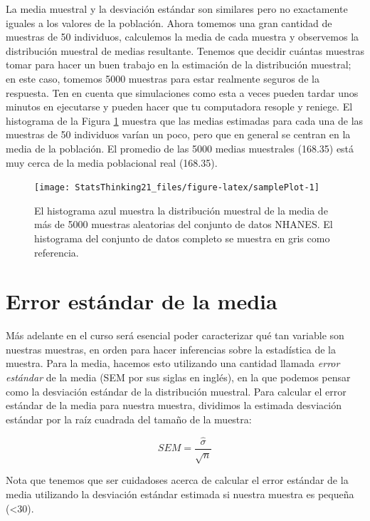 \documentclass[
  12pt,
]{book}
\begin{document}
La media muestral y la desviación estándar son similares pero no exactamente iguales a los valores de la población. Ahora tomemos una gran cantidad de muestras de 50 individuos, calculemos la media de cada muestra y observemos la distribución muestral de medias resultante. Tenemos que decidir cuántas muestras tomar para hacer un buen trabajo en la estimación de la distribución muestral; en este caso, tomemos 5000 muestras para estar realmente seguros de la respuesta. Ten en cuenta que simulaciones como esta a veces pueden tardar unos minutos en ejecutarse y pueden hacer que tu computadora resople y reniege. El histograma de la Figura \ref{fig:samplePlot} muestra que las medias estimadas para cada una de las muestras de 50 individuos varían un poco, pero que en general se centran en la media de la población. El promedio de las 5000 medias muestrales (168.35) está muy cerca de la media poblacional real (168.35).

\begin{figure}
\texttt{[image: StatsThinking21\_files/figure-latex/samplePlot-1]} \caption{El histograma azul muestra la distribución muestral de la media de más de 5000 muestras aleatorias del conjunto de datos NHANES. El histograma del conjunto de datos completo se muestra en gris como referencia.}\label{fig:samplePlot}
\end{figure}

\hypertarget{standard-error-of-the-mean}{%
\section{Error estándar de la media}\label{standard-error-of-the-mean}}

Más adelante en el curso será esencial poder caracterizar qué tan variable son nuestras muestras, en orden para hacer inferencias sobre la estadística de la muestra. Para la media, hacemos esto utilizando una cantidad llamada \emph{error estándar} de la media (SEM por sus siglas en inglés), en la que podemos pensar como la desviación estándar de la distribución muestral. Para calcular el error estándar de la media para nuestra muestra, dividimos la estimada desviación estándar por la raíz cuadrada del tamaño de la muestra:

\[
SEM = \frac{\hat{\sigma}}{\sqrt{n}}
\]

Nota que tenemos que ser cuidadoses acerca de calcular el error estándar de la media utilizando la desviación estándar estimada si nuestra muestra es pequeña (\textless30).
\end{document}
